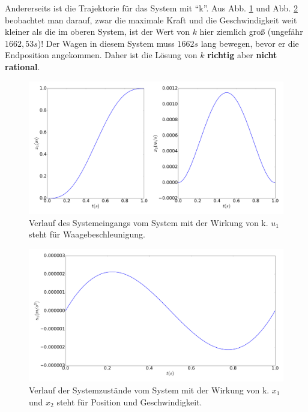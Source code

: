 \begin{beispiel}[Doppelintegrator]
	Andererseits ist die Trajektorie für das System mit ``k''. Aus Abb. \ref{fig:Doppelintegrator_mit_k_x} und Abb. \ref{fig:Doppelintegrator_mit_k_u} beobachtet man darauf, zwar die maximale Kraft und die Geschwindigkeit weit kleiner als die im oberen System, ist der Wert von $k$ hier ziemlich groß (ungefähr $1662,53s$)! Der Wagen in diesem System muss $1662s$ lang bewegen, bevor er die Endposition angekommen. Daher ist die Lösung von $k$ \textbf{richtig} aber \textbf{nicht rational}.
	\begin{figure}
		\centering
		\includegraphics[width=15.5cm]{bild/30_32/test0_mit_k_ori_x.pdf}
		\caption{Verlauf des Systemeingangs vom System mit der Wirkung von k. $u_{1}$ steht für Waagebeschleunigung.}
		\label{fig:Doppelintegrator_mit_k_x}
	\end{figure}
	\begin{figure}
		\centering
		\includegraphics[width=12cm]{bild/30_32/test0_mit_k_ori_u.pdf}
		\caption{Verlauf der Systemzustände vom System mit der Wirkung von k. $x_{1}$ und $x_{2}$ steht für Position und Geschwindigkeit.}
		\label{fig:Doppelintegrator_mit_k_u}
	\end{figure}
	

\end{beispiel}
